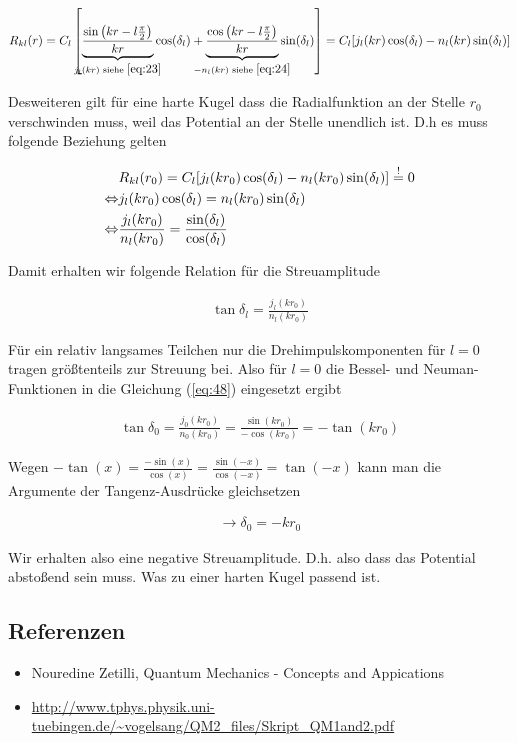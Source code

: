 \begin{align}
  \label{eq:46}
  R_{kl}(r) =  C_l \left[\underbr{\frac{\sin\left(kr-l\frac{\pi}{2}\right)}{kr}}_{j_l(kr) \text{ siehe }\eqref{eq:23}}\cos(\delta_l) + \underbr{\frac{\cos\left(kr-l\frac{\pi}{2}\right)}{kr}}_{-n_l(kr) \text{ siehe } \eqref{eq:24}}\sin(\delta_l)\right] =C_l [j_l(kr)\cos(\delta_l) -n_l(kr) \sin(\delta_l) ]
\end{align}

Desweiteren gilt für eine harte Kugel dass die Radialfunktion an der Stelle \(r_0\) verschwinden muss, weil das Potential an der Stelle unendlich ist. D.h es muss folgende Beziehung gelten

\begin{align}
  \label{eq:47}
   &R_{kl}(r_0) =C_l [j_l(kr_0)\cos(\delta_l) -n_l(kr_0) \sin(\delta_l) ] \stackrel{!}= 0 \notag\\
\Leftrightarrow &j_l(kr_0)\cos(\delta_l) = n_l(kr_0) \sin(\delta_l) \notag\\
\Leftrightarrow &\frac{ j_l(kr_0) }{n_l(kr_0)} = \frac{\sin(\delta_l)}{\cos(\delta_l)} \notag\\
\end{align}

Damit erhalten wir folgende Relation für die Streuamplitude

\begin{align}
  \label{eq:48}
  \tan\delta_l = \frac{ j_l(kr_0) }{n_l(kr_0)}
\end{align}

Für ein relativ langsames Teilchen nur die Drehimpulskomponenten für \(l=0\) tragen größtenteils zur Streuung bei. Also für \(l=0\) die Bessel- und Neuman-Funktionen in die Gleichung (\ref{eq:48}) eingesetzt ergibt

\begin{align}
  \label{eq:49}
  \tan\delta_0 = \frac{ j_0(kr_0) }{n_0(kr_0)} = \frac{ \sin(kr_0) }{-\cos(kr_0)} = -\tan(kr_0)
\end{align}

Wegen \(-\tan(x) = \frac{-\sin(x)}{\cos(x)} =\frac{\sin(-x)}{\cos(-x)} = \tan(-x) \) kann man die Argumente der Tangenz-Ausdrücke gleichsetzen

\begin{align}
  \label{eq:50}
  \boxed{ \rightarrow \delta_0 = - kr_0 }
\end{align}

Wir erhalten also eine negative Streuamplitude. D.h. also dass das Potential abstoßend sein muss. Was zu einer harten Kugel passend ist.


\subsection*{Referenzen}

\begin{itemize}
\item Nouredine Zetilli, Quantum Mechanics - Concepts and Appications
\item \url{http://www.tphys.physik.uni-tuebingen.de/~vogelsang/QM2_files/Skript_QM1and2.pdf}
\end{itemize}


